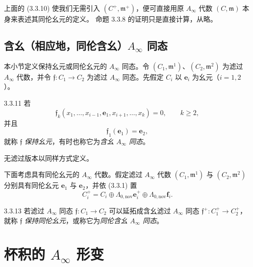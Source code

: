 上面的 (3.3.10) 使我们无需引入 $(C^+,\mathfrak m^+)$，便可直接用原
$A_\infty$ 代数 $(C,\mathfrak m)$ 本身来表述其同伦幺元的定义。
命题 3.3.8 的证明只是直接计算，从略。

\subsection{含幺（相应地，同伦含幺）$A_\infty$ 同态}
\label{subsec:3-3-2}

本小节定义保持幺元或同伦幺元的 $A_\infty$ 同态。令
$(C_1,\mathfrak m^1)$、$(C_2,\mathfrak m^2)$ 为滤过 $A_\infty$ 代数，并令
$\mathfrak f\colon C_1\to C_2$ 为滤过 $A_\infty$ 同态。先假定 $C_i$ 以
$\mathbf e_i$ 为幺元（$i=1,2$）。

\begin{definition}{3.3.11}\label{def:3-3-11}
若
\begin{equation}
  \mathfrak f_k(x_1,\ldots,x_{i-1},\mathbf e_1,
  x_{i+1},\ldots,x_k)=0,\qquad k\geq2,
  \tag{3.3.12.1}\label{eq:3-3-12-1}
\end{equation}
并且
\begin{equation}
  \mathfrak f_1(\mathbf e_1)=\mathbf e_2,
  \tag{3.3.12.2}\label{eq:3-3-12-2}
\end{equation}
就称 $\mathfrak f$ \emph{保持幺元}，有时也称它为\emph{含幺
$A_\infty$ 同态}。
\end{definition}

无滤过版本以同样方式定义。

下面考虑具有同伦幺元的 $A_\infty$ 代数。假定滤过 $A_\infty$ 代数
$(C_1,\mathfrak m^1)$ 与 $(C_2,\mathfrak m^2)$ 分别具有同伦幺元
$\mathbf e_1$ 与 $\mathbf e_2$，并依 (3.3.1) 置
\[
  C_i^+=C_i\oplus\Lambda_{0,\mathrm{nov}}\mathbf e_i^+
  \oplus\Lambda_{0,\mathrm{nov}}\mathbf f_i.
\]

\begin{definition}{3.3.13}\label{def:3-3-13}
若滤过 $A_\infty$ 同态 $\mathfrak f\colon C_1\to C_2$ 可以延拓成含幺滤过
$A_\infty$ 同态 $\mathfrak f^+\colon C_1^+\to C_2^+$，就称
$\mathfrak f$ \emph{保持同伦幺元}，或称它为\emph{同伦含幺
$A_\infty$ 同态}。
\end{definition}

\section{杯积的 $A_\infty$ 形变}
\label{sec:3-4}

